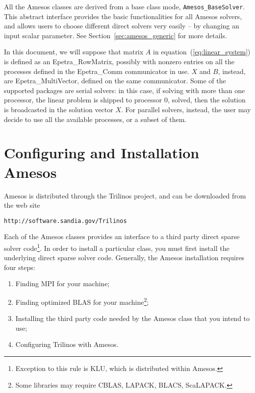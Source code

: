 \documentclass[11pt]{SANDreport}
\begin{document}
All the Amesos classes are derived from a base class mode,
\verb!Amesos_BaseSolver!. This abstract interface provides the basic
functionalities for all Amesos solvers, and allows users to choose
different direct solvers very easily -- by changing an input scalar
parameter. See Section~\ref{sec:amesos_generic} for more details.

In this document, we will suppose that matrix $A$ in
equation~(\ref{eq:linear_system}) is defined as an Epetra\_RowMatrix,
possibly with nonzero entries on all the processes defined in the
Epetra\_Comm communicator in use. $X$ and $B$, instead, are
Epetra\_MultiVector, defined on the same communicator.  Some of the
supported packages are serial solvers: in this case, if solving with
more than one processor, the linear problem is shipped to processor 0,
solved, then the solution is broadcasted in the solution vector $X$. For
parallel solvers, instead, the user may decide to use all the available
processes, or a subset of them.



\section{Configuring and Installation Amesos}
\label{sec:3pl}

Amesos is distributed through the Trilinos project, and can be
downloaded from the web site
\begin{verbatim}
http://software.sandia.gov/Trilinos
\end{verbatim}

\smallskip

Each of the Amesos classes provides an interface to a third party direct
sparse solver code\footnote{Exception to this rule is KLU, which is
  distributed within Amesos.}. In order to install a particular class, you
must first install the underlying direct sparse solver code. Generally,
the Amesos installation requires four steps:
\begin{enumerate}
\item Finding MPI for your machine;
\item Finding optimized BLAS for your machine\footnote{Some libraries
    may require CBLAS, LAPACK, BLACS, ScaLAPACK.};
\item Installing the third party code needed by the Amesos class that
  you intend to use;
\item Configuring Trilinos with Amesos. 
\end{enumerate}
\end{document}
